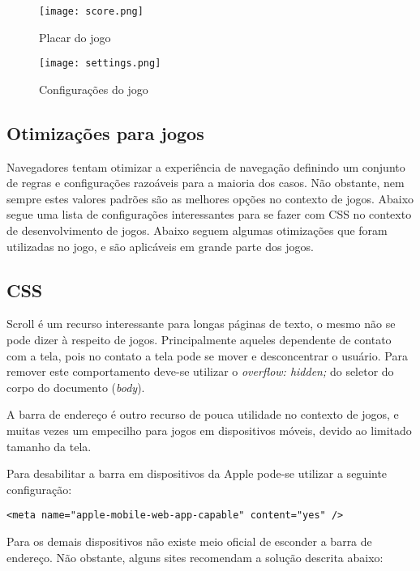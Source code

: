 \begin{figure}
    \centering
    \texttt{[image: score.png]}
	\caption{Placar do jogo}
\end{figure}

\begin{figure}
    \centering
    \texttt{[image: settings.png]}
	\caption{Configurações do jogo}
\end{figure}

\begin{draft}

\section{Otimizações para jogos}

Navegadores tentam otimizar a experiência de navegação definindo
um conjunto de regras e configurações razoáveis para a maioria dos
casos. Não obstante, nem sempre estes valores padrões são as melhores
opções no contexto de jogos. Abaixo segue uma lista de configurações
interessantes para se fazer com CSS no contexto de desenvolvimento de
jogos.
Abaixo seguem algumas otimizações que foram utilizadas no jogo, e são  aplicáveis 
em grande parte dos jogos.

\subsection{CSS}

Scroll é um recurso interessante para longas páginas de texto,
o mesmo não se pode dizer à respeito de jogos.
Principalmente aqueles dependente de contato com a tela, pois
no contato a tela pode se mover e desconcentrar o usuário. Para
remover este comportamento deve-se utilizar o \textit{overflow:
hidden;} do seletor do corpo do documento (\textit{body}).

A barra de endereço é outro recurso de pouca utilidade no contexto de
jogos, e muitas vezes um empecilho para jogos em dispositivos móveis,
devido ao limitado tamanho da tela.

Para desabilitar a barra em dispositivos da Apple pode-se utilizar a
seguinte configuração:

\begin{verbatim}
<meta name="apple-mobile-web-app-capable" content="yes" />
\end{verbatim}

Para os demais dispositivos não existe meio oficial de esconder a barra
de endereço. Não obstante, alguns sites recomendam a solução descrita abaixo:


\end{draft}
